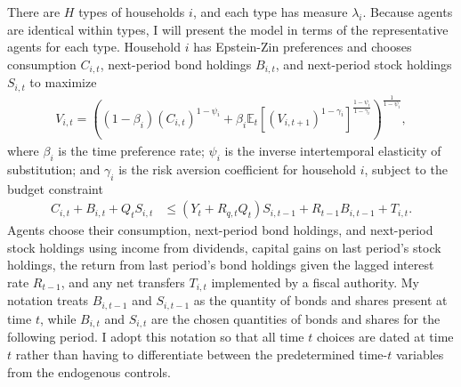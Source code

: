 \documentclass[12 pt, oneside]{article}
\theoremstyle{definition}
\theoremstyle{definition}
\theoremstyle{definition}
\newcommand{\E}{\mathbb{E}}
\begin{document}
There are $H$ types of households $i$, and each type has measure $\lambda_i$. Because agents are identical within types, I will present the model in terms of the representative agents for each type.
Household $i$ has Epstein-Zin preferences and chooses consumption $C_{i, t}$, next-period bond holdings $B_{i, t}$, and next-period stock holdings $S_{i, t}$ to maximize
\begin{align}\label{eq:hh objective}
  V_{i, t} = \left((1 - \beta_i)\left(C_{i, t}\right)^{1 - \psi_i} + \beta_i \E_t\left[\left(V_{i, t + 1}\right)^{1 - \gamma_i}\right]^{\frac{1 - \psi_i}{1 - \gamma_i}}\right)^{\frac{1}{1 - \psi_i}},
\end{align}
where $\beta_i$ is the time preference rate; $\psi_i$ is the inverse intertemporal elasticity of substitution; and $\gamma_i$ is the risk aversion coefficient for household $i$, subject to the budget constraint
\begin{align}\label{eq:hh budget constraint}
  C_{i, t} + B_{i, t} + Q_tS_{i, t} & \leq (Y_t + R_{q, t}Q_t)S_{i, t - 1} + R_{t - 1}B_{i, t - 1}  + T_{i, t}.
\end{align}
Agents choose their consumption, next-period bond holdings, and next-period stock holdings using income from dividends, capital gains on last period's stock holdings, the return from last period's bond holdings given the lagged interest rate $R_{t - 1}$, and any net transfers $T_{i, t}$ implemented by a fiscal authority.
My notation treats $B_{i, t - 1}$ and $S_{i, t - 1}$ as the quantity of bonds and shares present at time $t$, while $B_{i, t}$ and $S_{i, t}$ are the chosen quantities of bonds and shares for the following period. I adopt this notation so that all time $t$ choices are dated at time $t$ rather than having to differentiate between the predetermined time-$t$ variables from the endogenous controls.
\end{document}
